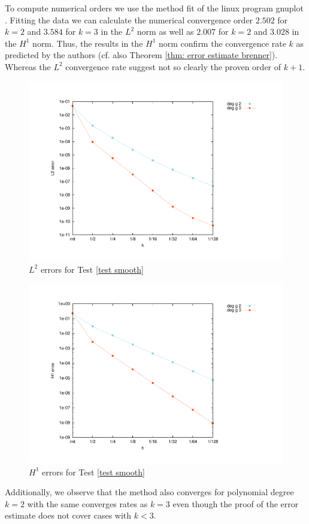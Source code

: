 To compute numerical orders we use the method fit of the linux program gnuplot \cite{gnuplot}. Fitting the data we can calculate the numerical convergence order $2.502$ for $k=2$ and $3.584$ for $k=3$ in the $L^2$ norm as well as $2.007$ for $k=2$ and $3.028$ in the $H^1$ norm. Thus, the results in the $H^1$ norm confirm the convergence rate $k$ as predicted by the authors (cf. also Theorem \ref{thm: error estimate brenner}). Whereas the $L^2$ convergence rate suggest not so clearly the proven order of $k+1$.
\begin{figure}[H]
\centering
	\includegraphics[scale=0.45]{plots/MA1_Brenner_l2.pdf}
	\caption{$L^2$ errors for Test \ref{test smooth}}
	\label{fig: Brenner test1}
\end{figure}
\begin{figure}[H]
	\centering
	\includegraphics[scale=0.45]{plots/MA1_Brenner_h1.pdf}
	\caption{$H^1$ errors for Test \ref{test smooth}}
	\label{fig: Brenner test1 h1}
\end{figure}
Additionally, we observe that the method also converges for polynomial degree $k=2$ with the same converges rates as $k=3$ even though the proof of the error estimate does not cover cases with $k<3$.


